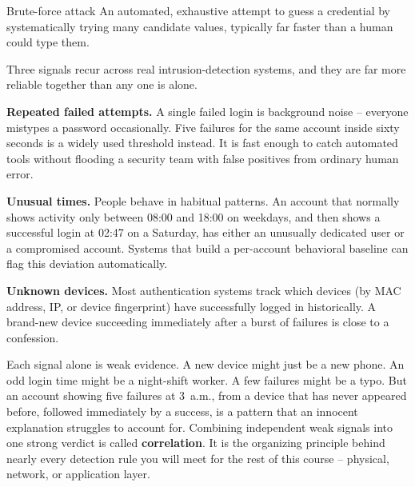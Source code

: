 \begin{definition}{Brute-force attack}
An automated, exhaustive attempt to guess a credential by systematically trying many candidate
values, typically far faster than a human could type them.
\end{definition}

Three signals recur across real intrusion-detection systems, and they are far more reliable
together than any one is alone.

\textbf{Repeated failed attempts.} A single failed login is background noise -- everyone
mistypes a password occasionally. Five failures for the same account inside sixty seconds is a
widely used threshold instead. It is fast enough to catch automated tools without flooding a
security team with false positives from ordinary human error.

\textbf{Unusual times.} People behave in habitual patterns. An account that normally shows
activity only between 08:00 and 18:00 on weekdays, and then shows a successful login at 02:47 on
a Saturday, has either an unusually dedicated user or a compromised account. Systems that build a
per-account behavioral baseline can flag this deviation automatically.

\textbf{Unknown devices.} Most authentication systems track which devices (by MAC address, IP,
or device fingerprint) have successfully logged in historically. A brand-new device succeeding
immediately after a burst of failures is close to a confession.

\begin{example}
Each signal alone is weak evidence. A new device might just be a new phone. An odd login time
might be a night-shift worker. A few failures might be a typo. But an account showing five
failures at 3~a.m., from a device that has never appeared before, followed immediately by a
success, is a pattern that an innocent explanation struggles to account for. Combining
independent weak signals into one strong verdict is called \textbf{correlation}. It is the
organizing principle behind nearly every detection rule you will meet for the rest of this
course -- physical, network, or application layer.
\end{example}


